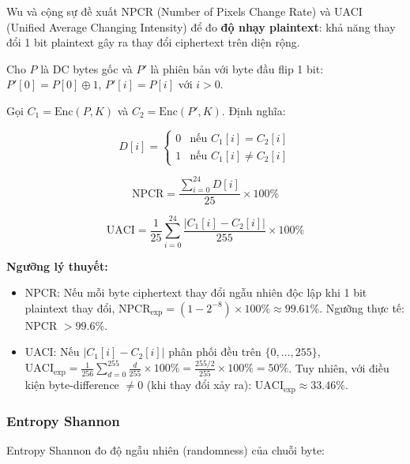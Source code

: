 Wu và cộng sự \cite{wu_npcr} đề xuất NPCR (Number of Pixels Change Rate) và
UACI (Unified Average Changing Intensity) để đo \textbf{độ nhạy plaintext}:
khả năng thay đổi 1 bit plaintext gây ra thay đổi ciphertext trên diện rộng.

Cho $P$ là DC bytes gốc và $P'$ là phiên bản với byte đầu flip 1 bit:
$P'[0] = P[0] \oplus 1$, $P'[i] = P[i]$ với $i > 0$.

Gọi $C_1 = \text{Enc}(P, K)$ và $C_2 = \text{Enc}(P', K)$. Định nghĩa:

\begin{equation}
D[i] = \begin{cases} 0 & \text{nếu } C_1[i] = C_2[i] \\ 1 & \text{nếu } C_1[i] \neq C_2[i] \end{cases}
\end{equation}

\begin{equation}
\text{NPCR} = \frac{\sum_{i=0}^{24} D[i]}{25} \times 100\%
\label{eq:npcr}
\end{equation}

\begin{equation}
\text{UACI} = \frac{1}{25} \sum_{i=0}^{24} \frac{|C_1[i] - C_2[i]|}{255} \times 100\%
\label{eq:uaci}
\end{equation}

\textbf{Ngưỡng lý thuyết:}
\begin{itemize}
  \item NPCR: Nếu mỗi byte ciphertext thay đổi ngẫu nhiên độc lập khi 1 bit
        plaintext thay đổi, $\text{NPCR}_{\text{exp}} = (1 - 2^{-8}) \times 100\% \approx 99.61\%$.
        Ngưỡng thực tế: NPCR $> 99.6\%$.

  \item UACI: Nếu $|C_1[i] - C_2[i]|$ phân phối đều trên $\{0, \ldots, 255\}$,
        $\text{UACI}_{\text{exp}} = \frac{1}{256} \sum_{d=0}^{255} \frac{d}{255} \times 100\%
        = \frac{255/2}{255} \times 100\% = 50\%$. Tuy nhiên, với điều kiện
        byte-difference $\neq 0$ (khi thay đổi xảy ra): $\text{UACI}_{\text{exp}} \approx 33.46\%$.
\end{itemize}

\subsubsection{Entropy Shannon}

Entropy Shannon \cite{shannon1949} đo độ ngẫu nhiên (randomness) của chuỗi byte:

